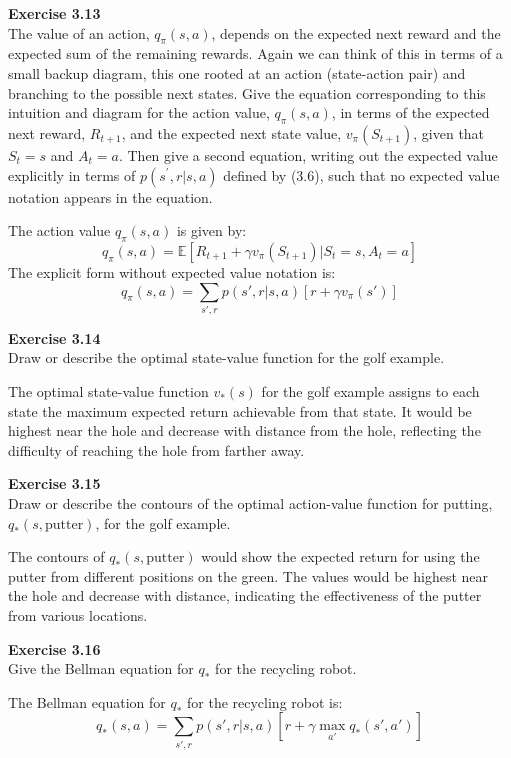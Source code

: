 \documentclass[addpoints]{exam}
\begin{document}
\begin{questions}
    \question
    \textbf{Exercise 3.13} \\ The value of an action, \( q_{\pi}(s,a) \), depends on the expected next reward and the expected sum of the remaining rewards. Again we can think of this in terms of a small backup diagram, this one rooted at an action (state-action pair) and branching to the possible next states. Give the equation corresponding to this intuition and diagram for the action value, \( q_{\pi}(s,a) \), in terms of the expected next reward, \( R_{t+1} \), and the expected next state value, \( v_{\pi}(S_{t+1}) \), given that \( S_{t}=s \) and \( A_{t}=a \). Then give a second equation, writing out the expected value explicitly in terms of \( p(s^{\prime},r|s,a) \) defined by (3.6), such that no expected value notation appears in the equation.
    \begin{solution}
        The action value \( q_{\pi}(s, a) \) is given by:
        \[
        q_{\pi}(s, a) = \mathbb{E}[R_{t+1} + \gamma v_{\pi}(S_{t+1}) | S_t = s, A_t = a]
        \]
        The explicit form without expected value notation is:
        \[
        q_{\pi}(s, a) = \sum_{s', r} p(s', r | s, a) \left[ r + \gamma v_{\pi}(s') \right]
        \]
    \end{solution}

    \question
    \textbf{Exercise 3.14} \\ Draw or describe the optimal state-value function for the golf example.
    \begin{solution}
        The optimal state-value function \( v_*(s) \) for the golf example assigns to each state the maximum expected return achievable from that state. It would be highest near the hole and decrease with distance from the hole, reflecting the difficulty of reaching the hole from farther away.
    \end{solution}

    \question
    \textbf{Exercise 3.15} \\ Draw or describe the contours of the optimal action-value function for putting, \( q_*(s, \text{putter}) \), for the golf example.
    \begin{solution}
        The contours of \( q_*(s, \text{putter}) \) would show the expected return for using the putter from different positions on the green. The values would be highest near the hole and decrease with distance, indicating the effectiveness of the putter from various locations.
    \end{solution}

    \question
    \textbf{Exercise 3.16} \\ Give the Bellman equation for \( q_* \) for the recycling robot.
    \begin{solution}
        The Bellman equation for \( q_* \) for the recycling robot is:
        \[
        q_*(s, a) = \sum_{s', r} p(s', r | s, a) \left[ r + \gamma \max_{a'} q_*(s', a') \right]
        \]
    \end{solution}


\end{questions}
\end{document}
